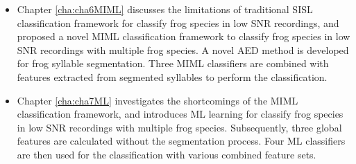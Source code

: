 \begin{itemize}


\item  Chapter \ref{cha:cha6MIML} discusses the limitations of traditional SISL classification framework for classify frog species in low SNR recordings, and proposed a novel MIML classification framework to classify frog species in low SNR recordings with multiple frog species. A novel AED method is developed for frog syllable segmentation. Three MIML classifiers are combined with features extracted from segmented syllables to perform the classification.


 



\item  Chapter \ref{cha:cha7ML} investigates the shortcomings of the MIML classification framework, and introduces ML learning for classify frog species in low SNR recordings with multiple frog species. Subsequently, three global features are calculated without the segmentation process.  Four ML classifiers are then used for the classification with various combined feature sets.


\end{itemize}
